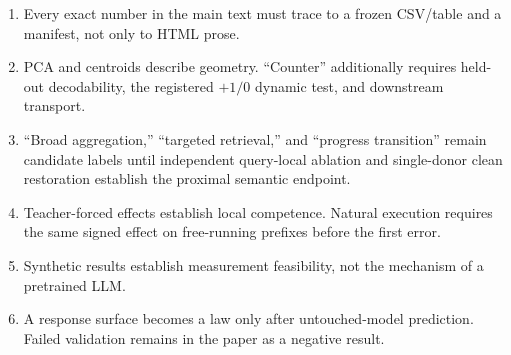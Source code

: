 \begin{enumerate}
  \item Every exact number in the main text must trace to a frozen CSV/table and a manifest, not only to HTML prose.
  \item PCA and centroids describe geometry. ``Counter'' additionally requires
  held-out decodability, the registered \(+1/0\) dynamic test, and downstream
  transport.
  \item ``Broad aggregation,'' ``targeted retrieval,'' and
  ``progress transition'' remain candidate labels until independent
  query-local ablation and single-donor clean restoration establish the
  proximal semantic endpoint.
  \item Teacher-forced effects establish local competence. Natural execution requires the same signed effect on free-running prefixes before the first error.
  \item Synthetic results establish measurement feasibility, not the mechanism of a pretrained LLM.
  \item A response surface becomes a law only after untouched-model prediction. Failed validation remains in the paper as a negative result.
\end{enumerate}
